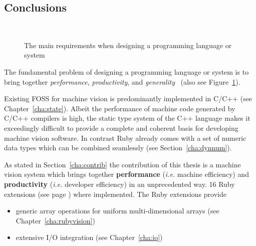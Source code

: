 \documentclass[12pt,a4paper,oneside,openright]{book}
\newcommand{\ie}{\emph{i.e.} }
\newcommand{\cha}[1]{Chapter~\ref{cha:#1}}
\newcommand{\sct}[1]{Section~\ref{cha:#1}}
\newcommand{\fig}[1]{Figure~\ref{fig:#1}}
\begin{document}
\begin{CJK}{UTF8}{}
\section{Conclusions}
\begin{figure}[htbp]
   \begin{center}
     \\
     \caption{The main requirements when designing a programming language or system \citep{wolczko2011}\label{fig:triangle}}
   \end{center}
\end{figure}
The fundamental problem of designing a programming language or system is to bring together \emph{performance}, \emph{productivity}, and \emph{generality}~\citet{wolczko2011} (also see \fig{triangle}).

Existing \ac{FOSS} for machine vision is predominantly implemented in C/C++ (see \cha{state}). Albeit the performance of machine code generated by C/C++ compilers is high, the static type system of the C++ language makes it exceedingly difficult to provide a complete and coherent basis for developing machine vision software. In contrast Ruby already comes with a set of numeric data types which can be combined seamlessly (see \sct{dynnum}).

As stated in \sct{contrib} the contribution of this thesis is a machine vision system which brings together \textbf{performance} (\ie machine efficiency) and \textbf{productivity} (\ie developer efficiency) in an unprecedented way. 16 Ruby extensions (see page \pageref{cha:software}) where implemented. The Ruby extensions provide
\begin{itemize}
\item generic array operations for uniform multi-dimensional arrays (see \cha{rubyvision})
\item extensive \ac{I}/\ac{O} integration (see \cha{io})
\end{itemize}


\end{CJK}
\end{document}
